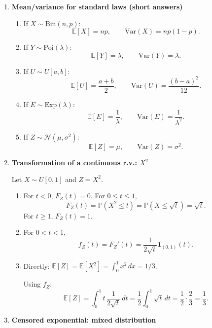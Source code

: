 \documentclass[11pt]{article}
\begin{document}
\begin{enumerate}
\bigskip

\item \textbf{Mean/variance for standard laws (short answers)}

\begin{enumerate}[label=(\alph*)]
\item If $X\sim\mathrm{Bin}(n,p)$:
\[
\mathbb{E}[X]=np,\qquad \mathrm{Var}(X)=np(1-p).
\]

\item If $Y\sim\mathrm{Poi}(\lambda)$:
\[
\mathbb{E}[Y]=\lambda,\qquad \mathrm{Var}(Y)=\lambda.
\]

\item If $U\sim U[a,b]$:
\[
\mathbb{E}[U]=\frac{a+b}{2},\qquad \mathrm{Var}(U)=\frac{(b-a)^2}{12}.
\]

\item If $E\sim \mathrm{Exp}(\lambda)$:
\[
\mathbb{E}[E]=\frac{1}{\lambda},\qquad \mathrm{Var}(E)=\frac{1}{\lambda^2}.
\]

\item If $Z\sim \mathcal{N}(\mu,\sigma^2)$:
\[
\mathbb{E}[Z]=\mu,\qquad \mathrm{Var}(Z)=\sigma^2.
\]
\end{enumerate}

\bigskip

\item \textbf{Transformation of a continuous r.v.: $X^2$}

Let $X\sim U[0,1]$ and $Z=X^2$.

\begin{enumerate}[label=(\alph*)]
\item For $t<0$, $F_Z(t)=0$. For $0\le t\le 1$,
\[
F_Z(t)=\mathbb{P}(X^2\le t)=\mathbb{P}(X\le \sqrt{t})=\sqrt{t}.
\]
For $t\ge 1$, $F_Z(t)=1$.

\item For $0<t<1$,
\[
f_Z(t)=F_Z'(t)=\frac{1}{2\sqrt{t}}\mathbf{1}_{(0,1)}(t).
\]

\item Directly: $\mathbb{E}[Z]=\mathbb{E}[X^2]=\int_0^1 x^2\,dx=1/3$.

Using $f_Z$:
\[
\mathbb{E}[Z]=\int_0^1 t\,\frac{1}{2\sqrt{t}}\,dt
=\frac12\int_0^1 \sqrt{t}\,dt
=\frac12\cdot\frac{2}{3}=\frac13.
\]
\end{enumerate}

\bigskip

\item \textbf{Censored exponential: mixed distribution}


\end{enumerate}
\end{document}
